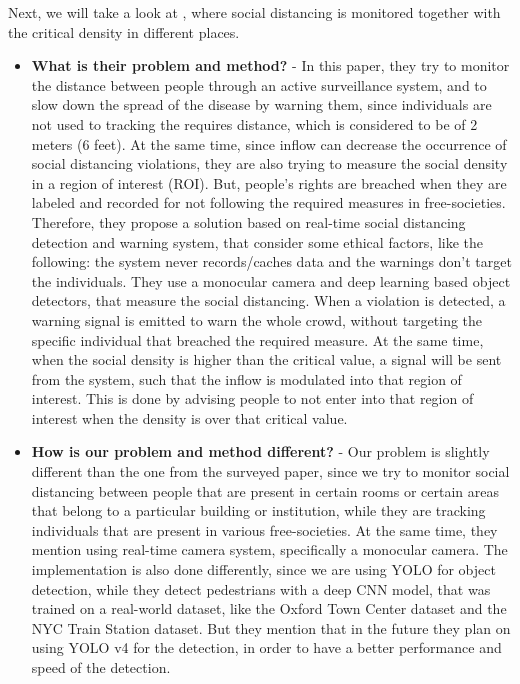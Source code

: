 \documentclass[runningheads,a4paper,11pt]{report}
\begin{document}
Next, we will take a look at \cite{CriticalDensity}, where social distancing is monitored together with the critical density in different places.

\begin{itemize}
	\item \textbf{What is their problem and method?} - In this paper, they try to monitor the distance between people through an active surveillance system, and to slow down the spread of the disease by warning them, since individuals are not used to tracking the requires distance, which is considered to be of 2 meters (6 feet). At the same time, since inflow can decrease the occurrence of social distancing violations, they are also trying to measure the social density in a region of interest (ROI). But, people's rights are breached when they are labeled and recorded for not following the required measures in free-societies. Therefore, they propose a solution based on real-time social distancing detection and warning system, that consider some ethical factors, like the following: the system never records/caches data and the warnings don't target the individuals. They use a monocular camera and deep learning based object detectors, that measure the social distancing. When a violation is detected, a warning signal is emitted to warn the whole crowd, without targeting the specific individual that breached the required measure. At the same time, when the social density is higher than the critical value, a signal will be sent from the system, such that the inflow is modulated into that region of interest. This is done by advising people to not enter into that region of interest when the density is over that critical value.
	\item \textbf{How is our problem and method different?} - Our problem is slightly different than the one from the surveyed paper, since we try to monitor social distancing between people that are present in certain rooms or certain areas that belong to a particular building or institution, while they are tracking individuals that are present in various free-societies. At the same time, they mention using real-time camera system, specifically a monocular camera. The implementation is also done differently, since we are using  YOLO for object detection, while they detect pedestrians with a deep CNN model, that was trained on a real-world dataset, like the Oxford Town Center dataset and the NYC Train Station dataset. But they mention that in the future they plan on using YOLO v4 for the detection, in order to have a better performance and speed of the detection.

\end{itemize}
\end{document}
